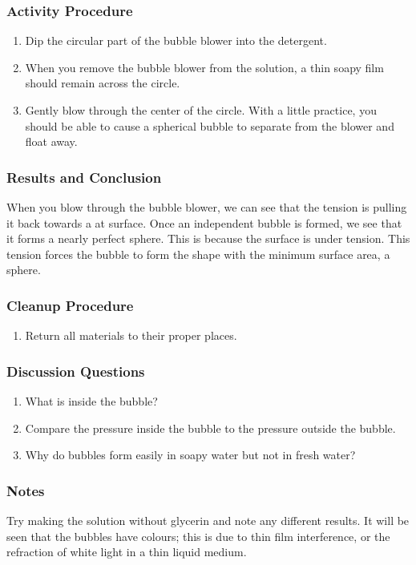 \subsubsection*{Activity Procedure}
\begin{enumerate}
\item{Dip the circular part of the bubble blower into the detergent.}
\item{When you remove the bubble blower from the solution, a thin soapy film should remain across the circle.}
\item{Gently blow through the center of the circle. With a little practice, you should be able to cause a spherical bubble to separate from the blower and float away.}
\end{enumerate}

\subsubsection*{Results and Conclusion}
When you blow through the bubble blower, we can see that the tension is pulling it back towards a at surface. Once an independent bubble is formed, we see that it forms a nearly perfect sphere. This is because the surface is under tension. This tension forces the bubble to form the shape with the minimum surface area, a sphere.

\subsubsection*{Cleanup Procedure}
\begin{enumerate}
\item{Return all materials to their proper places.}
\end{enumerate}

\subsubsection*{Discussion Questions}
\begin{enumerate}
\item{What is inside the bubble?}
\item{Compare the pressure inside the bubble to the pressure outside the bubble.}
\item{Why do bubbles form easily in soapy water but not in fresh water?}
\end{enumerate}

\subsubsection*{Notes}
Try making the solution without glycerin and note any different results.  It will be seen that the bubbles have colours; this is due to thin film interference, or the refraction of white light in a thin liquid medium.

